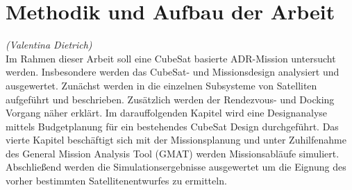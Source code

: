 	\section{Methodik und Aufbau der Arbeit}
		\hfill\emph{(Valentina Dietrich)}	\\
Im Rahmen dieser Arbeit soll eine  CubeSat basierte ADR-Mission untersucht werden. Insbesondere werden das CubeSat- und Missionsdesign analysiert und ausgewertet. Zunächst werden in  die einzelnen Subsysteme von Satelliten aufgeführt und beschrieben. Zusätzlich werden der Rendezvous- und Docking Vorgang näher erklärt. Im darauffolgenden Kapitel wird eine Designanalyse mittels Budgetplanung für ein bestehendes CubeSat Design durchgeführt.  Das vierte Kapitel beschäftigt sich mit der Missionsplanung und unter Zuhilfenahme des General Mission Analysis Tool (GMAT) werden Missionsabläufe simuliert. Abschließend werden die Simulationsergebnisse ausgewertet um die Eignung des vorher bestimmten Satellitenentwurfes zu ermitteln.
